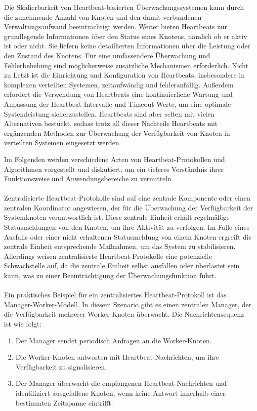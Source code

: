 Die Skalierbarkeit von Heartbeat-basierten Überwachungssystemen kann durch die zunehmende Anzahl von Knoten und den damit verbundenen Verwaltungsaufwand beeinträchtigt werden. Weiter bieten Heartbeats nur grundlegende Informationen über den Status eines Knotens, nämlich ob er aktiv ist oder nicht. Sie liefern keine detaillierten Informationen über die Leistung oder den Zustand des Knotens. Für eine umfassendere Überwachung und Fehlerbehebung sind möglicherweise zusätzliche Mechanismen erforderlich.
Nicht zu Letzt ist die  Einrichtung und Konfiguration von Heartbeats, insbesondere in komplexen verteilten Systemen, zeitaufwändig und fehleranfällig. Außerdem erfordert die Verwendung von Heartbeats eine kontinuierliche Wartung und Anpassung der Heartbeat-Intervalle und Timeout-Werte, um eine optimale Systemleistung sicherzustellen. 
Heartbeats sind aber selten mit vielen Alternativen bestückt, sodass trotz all dieser Nachteile Heartbeats mit ergänzenden Methoden zur Überwachung der Verfügbarkeit von Knoten in verteilten Systemen eingesetzt werden. 

Im Folgenden werden verschiedene Arten von Heartbeat-Protokollen und Algorithmen vorgestellt und diskutiert, um ein tieferes Verständnis ihrer Funktionsweise und Anwendungsbereiche zu vermitteln.
\\\\
Zentralisierte Heartbeat-Protokolle sind auf eine zentrale Komponente oder einen zentralen Koordinator angewiesen, der für die Überwachung der Verfügbarkeit der Systemknoten verantwortlich ist. Diese zentrale Einheit erhält regelmäßige Statusmeldungen von den Knoten, um ihre Aktivität zu verfolgen. Im Falle eines Ausfalls oder einer nicht erhaltenen Statusmeldung von einem Knoten ergreift die zentrale Einheit entsprechende Maßnahmen, um das System zu stabilisieren. Allerdings weisen zentralisierte Heartbeat-Protokolle eine potenzielle Schwachstelle auf, da die zentrale Einheit selbst ausfallen oder überlastet sein kann, was zu einer Beeinträchtigung der Überwachungsfunktion führt.
\\\\
Ein praktisches Beispiel für ein zentralisiertes Heartbeat-Protokoll ist das Manager-Worker-Modell. In diesem Szenario gibt es einen zentralen Manager, der die Verfügbarkeit mehrerer Worker-Knoten überwacht. Die Nachrichtensequenz ist wie folgt:
\begin{enumerate}[label=(\alph*)]
\item Der Manager sendet periodisch Anfragen an die Worker-Knoten.
\item Die Worker-Knoten antworten mit Heartbeat-Nachrichten, um ihre Verfügbarkeit zu signalisieren.
\item Der Manager überwacht die empfangenen Heartbeat-Nachrichten und identifiziert ausgefallene Knoten, wenn keine Antwort innerhalb einer bestimmten Zeitspanne eintrifft.
\end{enumerate}

